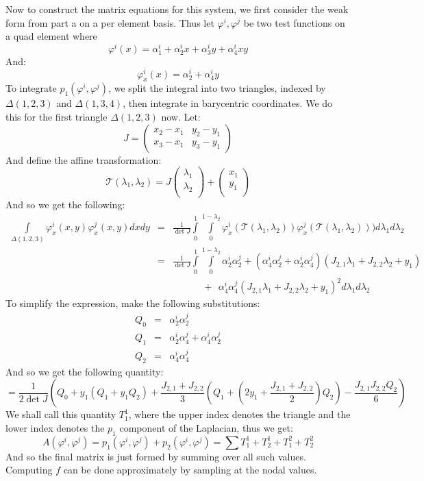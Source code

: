 \documentclass{article}
\begin{document}
Now to construct the matrix equations for this system, we first consider the weak form from part a on a per element basis.  Thus let $\varphi^i, \varphi^j$ be two test functions on a quad element where
\[ \varphi^i(x) = \alpha^i_1 + \alpha^i_2 x + \alpha^i_3 y + \alpha^i_4 x y \]
And:
\[ \varphi^i_{x}(x) = \alpha^i_2 + \alpha^i_4 y \]
To integrate $p_1(\varphi^i, \varphi^j)$, we split the integral into two triangles, indexed by $\Delta(1, 2, 3)$ and $\Delta(1, 3, 4)$, then integrate in barycentric coordinates.  We do this for the first triangle $\Delta(1,2,3)$ now.  Let:
\[ J = \left( \begin{array}{cc}
x_2 - x_1 & y_2 - y_1 \\
x_3 - x_1 & y_3 - y_1
\end{array} \right) \]
And define the affine transformation:
\[ \mathcal{T}(\lambda_1, \lambda_2) = J \left( \begin{array}{c}
\lambda_1 \\
\lambda_2 \\
\end{array} \right) + \left( \begin{array}{c}
x_1 \\
y_1 \\
\end{array} \right) \]
And so we get the following:
\begin{eqnarray*}
\int \limits_{\Delta(1,2,3)} \varphi^i_x(x,y) \varphi^j_x(x,y) d x d y & = & 
\frac{1}{\det J} \int \limits_{0}^{1} \int \limits_{0}^{1- \lambda_2} \varphi^i_{x}(\mathcal{T} (\lambda_1, \lambda_2)) \varphi^j_{x}(\mathcal{T}(\lambda_1, \lambda_2))) d \lambda_1 d \lambda_2  \\
& = & \frac{1}{\det J} \int \limits_{0}^{1} \int \limits_{0}^{1 - \lambda_2}
\alpha^i_2 \alpha^j_2 + (\alpha^i_4 \alpha^j_2  + \alpha^i_2 \alpha^j_4) (J_{2,1} \lambda_1 + J_{2,2} \lambda_2 + y_1) \\
& & \:\:\:\:\:\:\:\:\:\:\:\:\:\: + \:\: \alpha^i_4 \alpha^j_4 (J_{2,1} \lambda_1 + J_{2,2} \lambda_2 + y_1)^2 d \lambda_1 d \lambda_2 
\end{eqnarray*}
To simplify the expression, make the following substitutions:
\begin{eqnarray*}
Q_0 & = & \alpha^i_2 \alpha^j_2 \\
Q_1 & = & \alpha^i_2 \alpha^j_4 + \alpha^i_4 \alpha^j_2 \\
Q_2 & = & \alpha^i_4 \alpha^j_4
\end{eqnarray*}
And so we get the following quantity:
\[ = \frac{1}{2\det J} \left( 
  Q_0 + y_1 \left( Q_1 + y_1 Q_2 \right)
+ \frac{J_{2,1} + J_{2,2}}{3} \left(  
   Q_1 + \left( 2 y_1 + \frac{J_{2,1} + J_{2,2}}{2} \right) Q_2 \right)  - \frac{J_{2,1} J_{2,2} Q_2}{6} \right) \]
We shall call this quantity $T^1_1$, where the upper index denotes the triangle and the lower index denotes the $p_1$ component of the Laplacian, thus we get:
\[ A(\varphi^i, \varphi^j) = p_1(\varphi^i, \varphi^j) + p_2(\varphi^i, \varphi^j) = \sum T^1_1 + T^1_2 + T^2_1 + T^2_2 \]
And so the final matrix is just formed by summing over all such values.  Computing $f$ can be done approximately by sampling at the nodal values.
\end{document}
